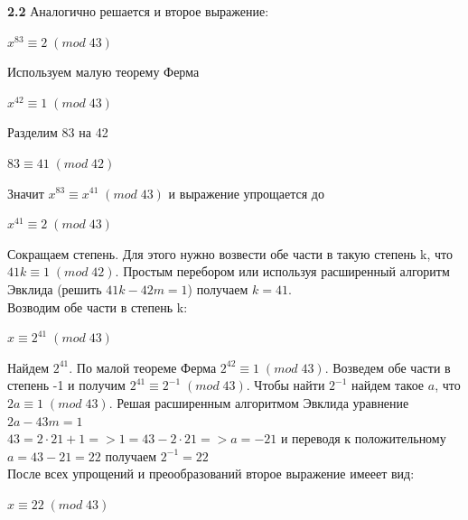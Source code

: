 \documentclass[12pt]{article}
\begin{document}
\begin{flushleft}
    
    \hspace{1.25cm}\textbf{2.2} Аналогично решается и второе выражение: \\
        \begin{center}
            $ x^{83} \equiv 2 \; (mod \; 43) $ \\
        \end{center}
    \hspace{1.25cm}Используем малую теорему Ферма \\
        \begin{center}
            $ x^{42} \equiv 1 \; (mod \; 43) $ \\
        \end{center}
    \hspace{1.25cm}Разделим 83 на 42 \\
        \begin{center}
            $ 83 \equiv 41 \; (mod \; 42) $ \\
        \end{center}
    \hspace{1.25cm}Значит $ x^{83} \equiv x^{41} \; (mod \; 43) $ и выражение упрощается до\\ 
        \begin{center}
            $ x^{41} \equiv 2 \; (mod \; 43) $ \\
        \end{center}
    \hspace{1.25cm}Сокращаем степень. Для этого нужно возвести обе части в
    такую степень k, что $ 41k \equiv 1 \; (mod \; 42) $. Простым перебором или
    используя расширенный алгоритм Эвклида (решить $ 41k - 42m = 1 $) получаем $ k = 41 $.\\
    \hspace{1.25cm}Возводим обе части в степень k: \\
        \begin{center}
            $ x \equiv 2^{41} \; (mod \; 43) $ \\
        \end{center}
    \hspace{1.25cm}Найдем $ 2^{41} $. По малой теореме Ферма
     $ 2^{42} \equiv 1 \; (mod \; 43) $. Возведем обе части в степень -1 и получим 
     $ 2^{41} \equiv 2^{-1} \; (mod \; 43) $. Чтобы найти $ 2^{-1} $ найдем такое $a$, что 
     $ 2a \equiv 1 \; (mod \; 43) $. Решая расширенным алгоритмом Эвклида уравнение 
     $ 2a - 43m = 1 $ \\
     \hspace{1.25cm}$ 43 = 2 \cdot 21 + 1 => 1 = 43 - 2 \cdot 21 => a = -21 $ и переводя к положительному $ a = 43 - 21 = 22 $ получаем $ 2^{-1} = 22 $ \\
    \hspace{1.25cm}После всех упрощений и преообразований второе выражение имееет вид: \\
        \begin{center}
            $ x \equiv 22 \; (mod \; 43) $ \\
        \end{center}
    


\end{flushleft}
\end{document}
